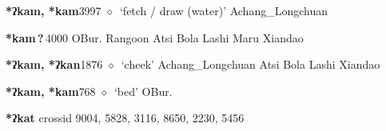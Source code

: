   \begin{list}{}{\leftmargin=1.5em \itemindent=-1.5em}
  \item {\footnotesize \textbf{*ʔkam, *kam}}{\tiny 3997}
         $\diamond$~`fetch / draw (water)'
         Achang\_Longchuan 
  \item {\footnotesize \textbf{*kam\,?\,}}{\tiny 4000}
\hspace{1ex}
         OBur. 
\hspace{1ex}
         Rangoon 
\hspace{1ex}
         Atsi 
\hspace{1ex}
         Bola 
\hspace{1ex}
         Lashi 
\hspace{1ex}
         Maru 
\hspace{1ex}
         Xiandao 
  \item {\footnotesize \textbf{*ʔkam, *ʔkan}}{\tiny 1876}
\hspace{1ex}
         $\diamond$~`cheek'
         Achang\_Longchuan 
\hspace{1ex}
         Atsi 
\hspace{1ex}
         Bola 
\hspace{1ex}
         Lashi 
\hspace{1ex}
         Xiandao 
  \item {\footnotesize \textbf{*ʔkam, *kam}}{\tiny 768}
\hspace{1ex}
         $\diamond$~`bed'
         OBur. 
  \end{list}
\item
\textbf{*ʔkat}
  {\tiny crossid 9004, 5828, 3116, 8650, 2230, 5456}
